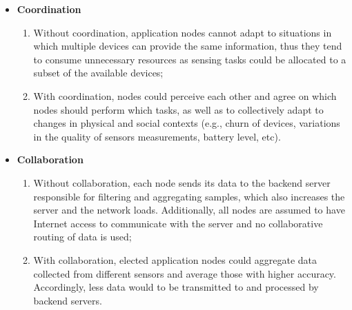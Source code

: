 %	
%	
%	

\begin{itemize}
	
	\item \textbf{Coordination}
	
	\begin{enumerate}[label=-]
		
		\item Without coordination, application nodes cannot adapt to situations in which multiple devices can provide the same information, thus they tend to consume unnecessary resources as sensing tasks could be allocated to a subset of the available devices;
		
		\item With coordination, nodes could perceive each other and agree on which nodes should perform which tasks, as well as to collectively adapt to changes in physical and social contexts (e.g., churn of devices, variations in the quality of sensors measurements, battery level, etc). 
		
	\end{enumerate}
	
	\item \textbf{Collaboration}
	
	\begin{enumerate}[label=-]
		
		\item Without collaboration, each node sends its data to the backend server responsible for filtering and aggregating samples, which also increases the server and the network loads. Additionally, all nodes are assumed to have Internet access to communicate with the server and no collaborative routing of data is used;
		
		\item With collaboration, elected application nodes could aggregate data collected from different sensors and average those with higher accuracy. Accordingly, less data would to be transmitted to and processed by backend servers.
		
	\end{enumerate}
\end{itemize}

